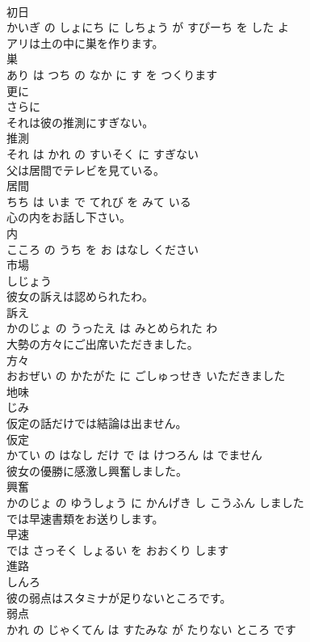 \documentclass[8pt]{extreport}
\begin{document}
\begin{CJK}{UTF8}{min}
\\	初日 
\\	かいぎ の しょにち に しちょう が すぴーち を した よ			
\\	アリは土の中に巣を作ります。	
\\	巣 
\\	あり は つち の なか に す を つくります			
\\	更に	
\\	さらに		
\\	それは彼の推測にすぎない。	
\\	推測 
\\	それ は かれ の すいそく に すぎない			
\\	父は居間でテレビを見ている。	
\\	居間 
\\	ちち は いま で てれび を みて いる			
\\	心の内をお話し下さい。	
\\	内 
\\	こころ の うち を お はなし ください			
\\	市場	
\\	しじょう		
\\	彼女の訴えは認められたわ。	
\\	訴え 
\\	かのじょ の うったえ は みとめられた わ			
\\	大勢の方々にご出席いただきました。	
\\	方々 
\\	おおぜい の かたがた に ごしゅっせき いただきました			
\\	地味	
\\	じみ		
\\	仮定の話だけでは結論は出ません。	
\\	仮定 
\\	かてい の はなし だけ で は けつろん は でません			
\\	彼女の優勝に感激し興奮しました。	
\\	興奮 
\\	かのじょ の ゆうしょう に かんげき し こうふん しました			
\\	では早速書類をお送りします。	
\\	早速 
\\	では さっそく しょるい を おおくり します			
\\	進路	
\\	しんろ		
\\	彼の弱点はスタミナが足りないところです。	
\\	弱点 
\\	かれ の じゃくてん は すたみな が たりない ところ です			

\end{CJK}
\end{document}
